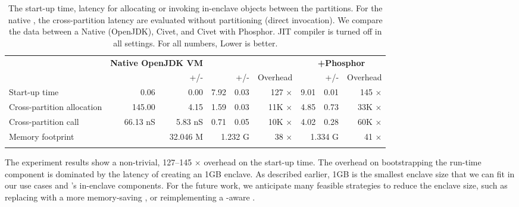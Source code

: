 \begin{table*}[t]
\caption{The start-up time, latency for allocating or invoking in-enclave objects between the partitions. For the native \jvm{}, the cross-partition latency are evaluated without partitioning (direct invocation). We compare the data between a Native \jvm{} (OpenJDK), Civet, and Civet with Phosphor. JIT compiler is turned off in all settings. For all numbers, Lower is better.}
\centering
\begin{tabular}{lrrrrrrrr}
\hline
\addlinespace[2pt]
 & \multicolumn{2}{c}{{\bf Native OpenJDK VM}} & \multicolumn{3}{c}{{\bf \sysname{}}} & \multicolumn{3}{c}{{\bf \sysname{}+Phosphor}} \\
 & & {\footnotesize +/-} & &  {\footnotesize +/-} & Overhead &  & {\footnotesize +/-} & Overhead \\
\hline
\addlinespace[2pt]
Start-up time &  0.06 \hspace{0.5em}\asec{}  & 0.00 \hspace{0.5em}\asec{} & 7.92 \hspace{0.5em}\asec{} & 0.03 \hspace{0.5em}\asec{} & 127 $\times$ & 9.01 \hspace{0.5em}\asec{} & 0.01 \hspace{0.5em}\asec{} & 145 $\times$ \\
Cross-partition allocation &  145.00 \nsec{}  & 4.15 \nsec{} & 1.59 \usec{} & 0.03 \usec{} & 11K $\times$ & 4.85 \usec{} & 0.73 \usec{} & 33K $\times$ \\
Cross-partition call       & 66.13 nS & 5.83 nS & 0.71 \usec{} & 0.05 \usec{} & 10K $\times$ & 4.02 \usec{} & 0.28 \usec{} & 60K $\times$ \\
\addlinespace[2pt]
\hline
\addlinespace[2pt]
Memory footprint & \multicolumn{2}{r}{32.046 M}&  \multicolumn{2}{r}{1.232 G} & 38 $\times$ & \multicolumn{2}{r}{1.334 G} & 41 $\times$ \\
\addlinespace[2pt]
\hline
\end{tabular}
\label{tab:perf}
\end{table*}

The experiment results show a non-trivial, 127--145 $\times$ overhead on
the start-up time. %
The overhead on bootstrapping the \sysname{} run-time component
is dominated by the latency of creating an 1GB \sgx{} enclave.
As described earlier, 1GB is the smallest enclave size
that we can fit in our use cases and \sysname{}'s in-enclave components.
For the future work, we anticipate many feasible strategies to reduce the enclave size, such as replacing with a more memory-saving \jvm{}, or reimplementing a \sgx{}-aware \jvmname{}.


